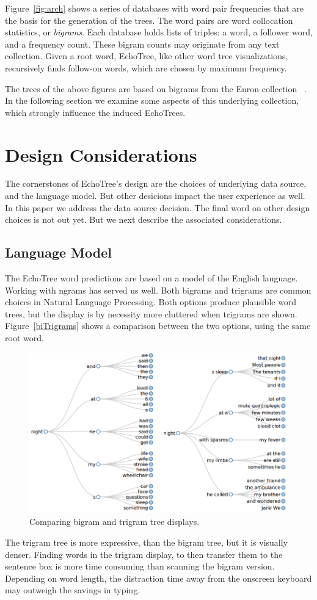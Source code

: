 \documentclass{sigchi}
\begin{document}
Figure~\ref{fig:arch} shows a series of databases with word pair
frequencies that are the basis for the generation of the trees. The
word pairs are word collocation statistics, or {\em bigrams}.  Each
database holds lists of triples: a word, a follower word, and a
frequency count. These bigram counts may originate from any text
collection. Given a root word, EchoTree, like other word tree
visualizations, recursively finds follow-on words, which are chosen by
maximum frequency.

The trees of the above figures are based on bigrams from the Enron
collection ~\cite{enron}. In the following section we examine some
aspects of this underlying collection, which strongly influence the
induced EchoTrees.

\section{Design Considerations}

The cornerstones of EchoTree's design are the choices of underlying
data source, and the language model. But other desicions impact the
user experience as well. In this paper we address the data source
decision. The final word on other design choices is not out yet. But
we next describe the associated considerations.

\subsection{Language Model}
The EchoTree word predictions are based on a model of the English
language. Working with ngrams has served us well. Both bigrams and
trigrams are common choices in Natural Language Processing. Both
options produce plausible word trees, but the display is by necessity
more cluttered when trigrams are shown. Figure~\ref{biTrigrams} shows
a comparison between the two options, using the same root word.
\begin{figure}
   \centering
   \includegraphics[width=\columnwidth]{Figs/biAndTrigrams.png}
   \caption{Comparing bigram and trigram tree displays.}
   \label{fig:biTrigrams}
\end{figure}
The trigram tree is more expressive, than the bigram tree, but it is
visually denser. Finding words in the trigram display, to then transfer
them to the sentence box is more time consuming than scanning the bigram
version. Depending on word length, the distraction time away from the
onscreen keyboard may outweigh the savings in typing.
\end{document}
